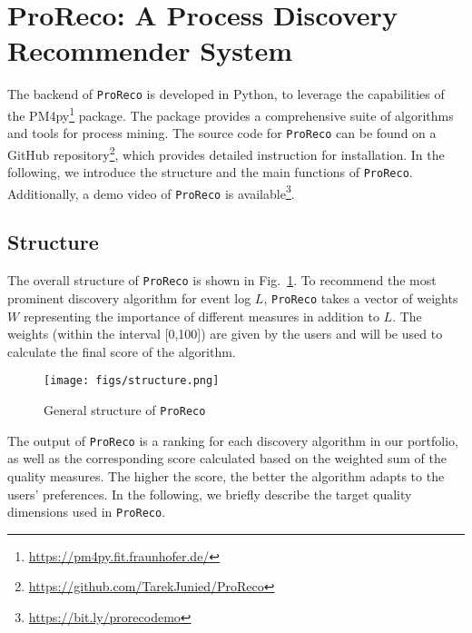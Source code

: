 \section{ProReco: A Process Discovery Recommender System}\label{sec:ProReco}
The backend of \texttt{ProReco} is developed in Python, to leverage the capabilities of the PM4py\footnote{\url{https://pm4py.fit.fraunhofer.de/}} package. 
The package provides a comprehensive suite of algorithms and tools for process mining. 
The source code for \texttt{ProReco} can be found on a GitHub repository\footnote{\url{https://github.com/TarekJunied/ProReco}}, which provides detailed instruction for installation. 
In the following, we introduce the structure and the main functions of \texttt{ProReco}. 
Additionally, a demo video of \texttt{ProReco} is available\footnote{\url{https://bit.ly/prorecodemo}}. 
\subsection{Structure}\label{subsec:ProReco-structure}
The overall structure of \texttt{ProReco} is shown in Fig.~\ref{fig:structure}. 
To recommend the most prominent discovery algorithm for event log $L$, \texttt{ProReco} takes a vector of weights $W$ representing the importance of different measures in addition to $L$. 
The weights (within the interval [0,100]) are given by the users and will be used to calculate the final score of the algorithm. 

\begin{figure}[h!]
    \vspace{-1.5em}
    \centering
    \texttt{[image: figs/structure.png]}
    \caption{
        General structure of \texttt{ProReco}
    } \label{fig:structure}
    \vspace{-1.5em}
\end{figure}

The output of \texttt{ProReco} is a ranking for each discovery algorithm in our portfolio, as well as the corresponding score calculated based on the weighted sum of the quality measures. 
The higher the score, the better the algorithm adapts to the users' preferences. 
In the following, we briefly describe the target quality dimensions used in \texttt{ProReco}.  

